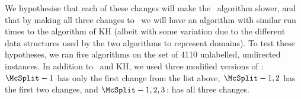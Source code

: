 We hypothesise that each of these changes will make the \McSplit\ algorithm slower, and that
by making all three changes to \McSplit\ we will have an algorithm with similar run times
to the algorithm of KH (albeit with some variation due to the different data structures
used by the two algorithms to represent domains).
To test these hypotheses, we ran five algorithms
on the set of 4110 unlabelled, undirected instances.  In addition to \McSplit\ and
KH, we used three modified versions of \McSplit:
$\McSplit - 1$ has only the first change from the list above,
$\McSplit - 1,2$ has the first two changes, and
$\McSplit - 1,2,3$: has all three changes.

\begin{figure}[htb]
    \centering
\end{figure}
